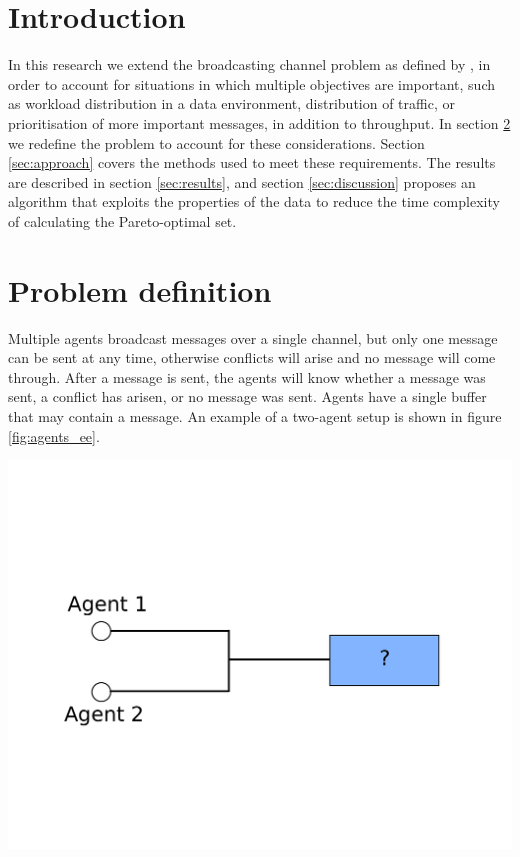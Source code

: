 \documentclass{article}
\makeatletter
\newenvironment{figurehere}
{\def\@captype{figure}}
{}
\makeatother
\begin{document}
	\begin{multicols}{2}

	\section{Introduction}
	\label{sec:introduction}
	In this research we extend the broadcasting channel problem as defined by
	\citet{ooi1996decentralized}, in order to account for situations in which
	multiple objectives are important, such as workload distribution in a data
	environment, distribution of traffic, or prioritisation of more important
	messages, in addition to throughput.
	In section \ref{sec:problem_definition} we redefine the problem to account
	for these considerations. Section \ref{sec:approach} covers the methods used
	to meet these requirements. The results are described in section
	\ref{sec:results}, and section \ref{sec:discussion} proposes an algorithm
	that exploits the properties of the data to reduce the time complexity of
	calculating the Pareto-optimal set.

	\section{Problem definition}
	\label{sec:problem_definition}
	Multiple agents broadcast messages over a single channel, but only one
	message can be sent at any time, otherwise conflicts will arise and no
	message will come through. After a message is sent, the agents will know
	whether a message was sent, a conflict has arisen, or no message was sent.
	Agents have a single buffer that may contain a message. An example of a
	two-agent setup is shown in figure \ref{fig:agents_ee}.

	\begin{figurehere}
		\centering
		\includegraphics[scale=0.3]{images/agents_ee}
	   \label{fig:agents_ee}
	\end{figurehere}


\end{multicols}
\end{document}
